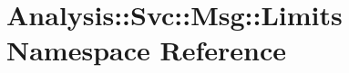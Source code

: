\hypertarget{namespaceAnalysis_1_1Svc_1_1Msg_1_1Limits}{}\section{Analysis\+:\+:Svc\+:\+:Msg\+:\+:Limits Namespace Reference}
\label{namespaceAnalysis_1_1Svc_1_1Msg_1_1Limits}
